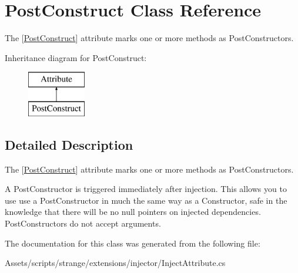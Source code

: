 \hypertarget{class_post_construct}{\section{Post\-Construct Class Reference}
\label{class_post_construct}
}


The {\ttfamily \mbox{[}\hyperlink{class_post_construct}{Post\-Construct}\mbox{]}} attribute marks one or more methods as Post\-Constructors.  


Inheritance diagram for Post\-Construct\-:\begin{figure}[H]
\begin{center}
\leavevmode
\includegraphics[height=2.000000cm]{class_post_construct}
\end{center}
\end{figure}


\subsection{Detailed Description}
The {\ttfamily \mbox{[}\hyperlink{class_post_construct}{Post\-Construct}\mbox{]}} attribute marks one or more methods as Post\-Constructors. 

A Post\-Constructor is triggered immediately after injection. This allows you to use use a Post\-Constructor in much the same way as a Constructor, safe in the knowledge that there will be no null pointers on injected dependencies. Post\-Constructors do not accept arguments. 

The documentation for this class was generated from the following file\-:\begin{DoxyCompactItemize}
\item 
Assets/scripts/strange/extensions/injector/Inject\-Attribute.\-cs\end{DoxyCompactItemize}
